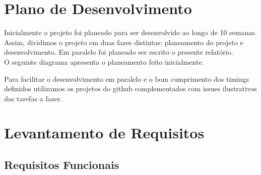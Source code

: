 \documentclass[a4paper]{report}
\begin{document}
\chapter{Plano de Desenvolvimento}
    Inicialmente o projeto foi planeado para ser desenvolvido ao longo de 10
    semanas. Assim, dividimos o projeto em duas fazes distintas: planeamento do
    projeto e desenvolvimento. Em paralelo foi planeado ser escrito o presente
    relatório.\\
    O seguinte diagrama apresenta o planeamento feito inicialmente.

    \noindent{}

    Para facilitar o desenvolvimento em paralelo e o bom cumprimento dos timings
    definidos utilizamos os projetos do github complementados com issues
    ilustrativos das tarefas a fazer.


\chapter{Levantamento de Requisitos}
    \section{Requisitos Funcionais}
\end{document}
